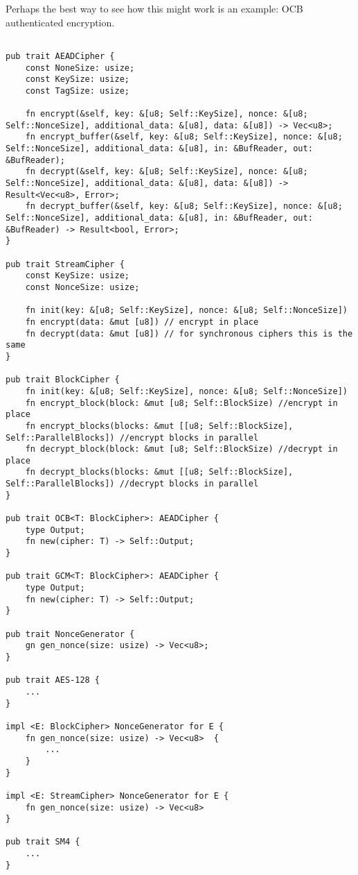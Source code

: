 \documentclass[letterpaper,11pt]{article}
\begin{document}
Perhaps the best way to see how this might work is an example:  OCB authenticated encryption.

\begin{verbatim}

pub trait AEADCipher {
    const NoneSize: usize;
    const KeySize: usize;
    const TagSize: usize;
    
    fn encrypt(&self, key: &[u8; Self::KeySize], nonce: &[u8; Self::NonceSize], additional_data: &[u8], data: &[u8]) -> Vec<u8>;
    fn encrypt_buffer(&self, key: &[u8; Self::KeySize], nonce: &[u8; Self::NonceSize], additional_data: &[u8], in: &BufReader, out: &BufReader);
    fn decrypt(&self, key: &[u8; Self::KeySize], nonce: &[u8; Self::NonceSize], additional_data: &[u8], data: &[u8]) -> Result<Vec<u8>, Error>;
    fn decrypt_buffer(&self, key: &[u8; Self::KeySize], nonce: &[u8; Self::NonceSize], additional_data: &[u8], in: &BufReader, out: &BufReader) -> Result<bool, Error>;
}

pub trait StreamCipher {
    const KeySize: usize;
    const NonceSize: usize;

    fn init(key: &[u8; Self::KeySize], nonce: &[u8; Self::NonceSize])
    fn encrypt(data: &mut [u8]) // encrypt in place
    fn decrypt(data: &mut [u8]) // for synchronous ciphers this is the same 
}

pub trait BlockCipher {
    fn init(key: &[u8; Self::KeySize], nonce: &[u8; Self::NonceSize])
    fn encrypt_block(block: &mut [u8; Self::BlockSize) //encrypt in place
    fn encrypt_blocks(blocks: &mut [[u8; Self::BlockSize], Self::ParallelBlocks]) //encrypt blocks in parallel
    fn decrypt_block(block: &mut [u8; Self::BlockSize) //decrypt in place
    fn decrypt_blocks(blocks: &mut [[u8; Self::BlockSize], Self::ParallelBlocks]) //decrypt blocks in parallel
}

pub trait OCB<T: BlockCipher>: AEADCipher {
    type Output;
    fn new(cipher: T) -> Self::Output;
}

pub trait GCM<T: BlockCipher>: AEADCipher {
    type Output;
    fn new(cipher: T) -> Self::Output;
}

pub trait NonceGenerator {
    gn gen_nonce(size: usize) -> Vec<u8>; 
}

pub trait AES-128 {
    ...
}

impl <E: BlockCipher> NonceGenerator for E {
    fn gen_nonce(size: usize) -> Vec<u8>  {
        ...
    }
}

impl <E: StreamCipher> NonceGenerator for E {
    fn gen_nonce(size: usize) -> Vec<u8>
}

pub trait SM4 {
    ...
}

\end{verbatim}
\end{document}
